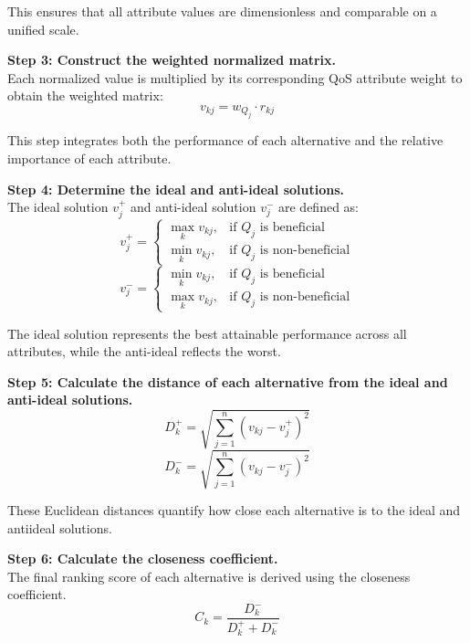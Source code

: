 \documentclass[twocolumn]{svjour3}
\begin{document}
This ensures that all attribute values are dimensionless and comparable on a unified scale.

\textbf{Step 3: Construct the weighted normalized matrix.} \\
Each normalized value is multiplied by its corresponding QoS attribute weight to obtain the weighted matrix:
\begin{equation}
v_{kj} = w_{Q_j} \cdot r_{kj}
\label{eq:weighted_matrix}
\end{equation}

This step integrates both the performance of each alternative and the relative importance of each attribute.

\textbf{Step 4: Determine the ideal and anti-ideal solutions.} \\
The ideal solution $v_j^+$ and anti-ideal solution $v_j^-$ are defined as:
\begin{equation}
v_j^+ = 
\begin{cases}
\max_k v_{kj}, & \text{if } Q_j \text{ is beneficial} \\
\min_k v_{kj}, & \text{if } Q_j \text{ is non-beneficial}
\end{cases}
\label{eq:ideal}
\end{equation}
\begin{equation}
v_j^- = 
\begin{cases}
\min_k v_{kj}, & \text{if } Q_j \text{ is beneficial} \\
\max_k v_{kj}, & \text{if } Q_j \text{ is non-beneficial}
\end{cases}
\label{eq:anti_ideal}
\end{equation}

The ideal solution represents the best attainable performance across all attributes, while the anti-ideal reflects the worst.

\textbf{Step 5: Calculate the distance of each alternative from the ideal and anti-ideal solutions.}
\begin{equation}
D_k^+ = \sqrt{ \sum_{j=1}^{n} (v_{kj} - v_j^+)^2 }
\label{eq:distance_ideal}
\end{equation}
\begin{equation}
D_k^- = \sqrt{ \sum_{j=1}^{n} (v_{kj} - v_j^-)^2 }
\label{eq:distance_anti_ideal}
\end{equation}

These Euclidean distances quantify how close each alternative is to the ideal and antiideal solutions.

\textbf{Step 6: Calculate the closeness coefficient.} \\
The final ranking score of each alternative is derived using the closeness coefficient.
\begin{equation}
C_k = \frac{D_k^-}{D_k^+ + D_k^-}
\label{eq:closeness}
\end{equation}
\end{document}
